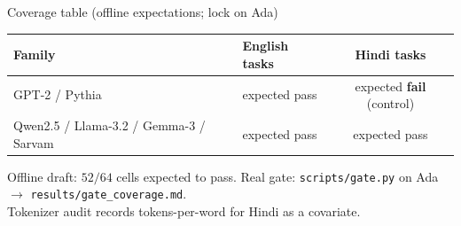 \documentclass[aspectratio=169,10pt]{beamer}
\begin{document}
\begin{frame}{Coverage table (offline expectations; lock on Ada)}
\begin{center}
\footnotesize
\begin{tabular}{@{}llc@{}}
\toprule
\textbf{Family} & \textbf{English tasks} & \textbf{Hindi tasks}\\
\midrule
GPT-2 / Pythia & expected pass & expected \textbf{fail} (control)\\
Qwen2.5 / Llama-3.2 / Gemma-3 / Sarvam & expected pass & expected pass\\
\bottomrule
\end{tabular}
\end{center}
\vspace{0.5em}
Offline draft: $52/64$ cells expected to pass. Real gate: \texttt{scripts/gate.py} on Ada $\to$ \texttt{results/gate\_coverage.md}.\\[4pt]
Tokenizer audit records tokens-per-word for Hindi as a covariate.
\end{frame}
\end{document}
